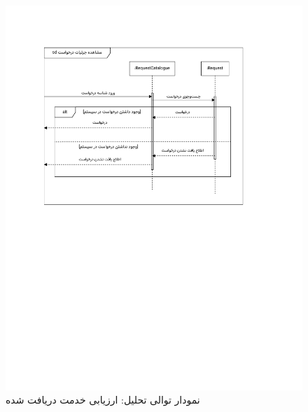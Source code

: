 \begin{figure}[ht!]
	\centering
	\includegraphics[scale=0.6, page=11]{figs/OOD-Sequence-2.pdf}
	\caption{نمودار توالی تحلیل: ارزیابی خدمت دریافت شده}
\end{figure}
\FloatBarrier
\newpage

